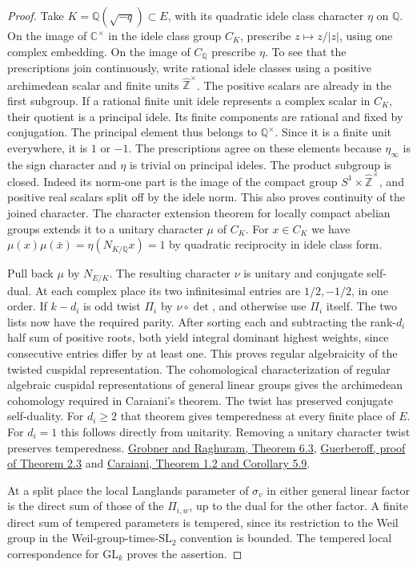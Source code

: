 \documentclass[a4paper,11pt]{article}
\theoremstyle{definition}
\theoremstyle{remark}
\numberwithin{equation}{section}
\begin{document}
\begin{proof}
Take \(K=\mathbb Q(\sqrt{-q})\subset E\), with its quadratic
idele class character \(\eta\) on \(\mathbb Q\). On the
image of \(\mathbb C^\times\) in the idele class group
\(C_K\), prescribe \(z\mapsto z/|z|\), using one complex
embedding. On the image of \(C_{\mathbb Q}\) prescribe
\(\eta\). To see that the prescriptions join continuously,
write rational idele classes using a positive archimedean
scalar and finite units \(\widehat{\mathbb Z}^{\times}\).
The positive scalars are already in the first subgroup.
If a rational finite unit idele represents a complex scalar
in \(C_K\), their quotient is a principal idele. Its finite
components are rational and fixed by conjugation. The
principal element thus belongs to \(\mathbb Q^\times\).
Since it is a finite unit everywhere, it is \(1\) or \(-1\).
The prescriptions agree on these elements because
\(\eta_\infty\) is the sign character and \(\eta\) is
trivial on principal ideles. The product subgroup is closed.
Indeed its norm-one part is the image of the compact group
\(S^1\times\widehat{\mathbb Z}^{\times}\), and positive
real scalars split off by the idele norm. This also proves
continuity of the joined character. The character
extension theorem for locally compact abelian groups
extends it to a unitary character \(\mu\) of \(C_K\).
For \(x\in C_K\) we have
\(\mu(x)\mu(\bar x)=\eta(N_{K/\mathbb Q}x)=1\) by
quadratic reciprocity in idele class form.

Pull back \(\mu\) by \(N_{E/K}\). The resulting character
\(\nu\) is unitary and conjugate self-dual. At each complex
place its two infinitesimal entries are \(1/2,-1/2\), in
one order. If \(k-d_i\) is odd twist \(\Pi_i\) by
\(\nu\circ\det\), and otherwise use \(\Pi_i\) itself.
The two lists now have the required parity. After sorting
each and subtracting the rank-\(d_i\) half sum of positive
roots, both yield integral dominant highest weights, since
consecutive entries differ by at least one. This proves
regular algebraicity of the twisted cuspidal representation.
The cohomological characterization of regular algebraic
cuspidal representations of general linear groups gives
the archimedean cohomology required in Caraiani's theorem.
The twist has preserved conjugate self-duality. For
\(d_i\ge2\) that theorem gives temperedness at every
finite place of \(E\). For \(d_i=1\) this follows directly
from unitarity. Removing a unitary character twist
preserves temperedness.
\href{https://homepage.univie.ac.at/harald.grobner/papers/GLn(D).pdf}
{Grobner and Raghuram, Theorem 6.3},
\href{https://doi.org/10.1112/S0010437X10005154}
{Guerberoff, proof of Theorem 2.3} and
\href{https://arxiv.org/abs/1010.2188}
{Caraiani, Theorem 1.2 and Corollary 5.9}.

At a split place the local Langlands parameter of
\(\sigma_v\) in either general linear factor is the
direct sum of those of the \(\Pi_{i,w}\), up to the dual
for the other factor. A finite direct sum of tempered
parameters is tempered, since its restriction to the
Weil group in the Weil-group-times-\(\mathrm{SL}_2\)
convention is bounded. The tempered local correspondence
for \(\mathrm{GL}_k\) proves the assertion.
\end{proof}
\end{document}
